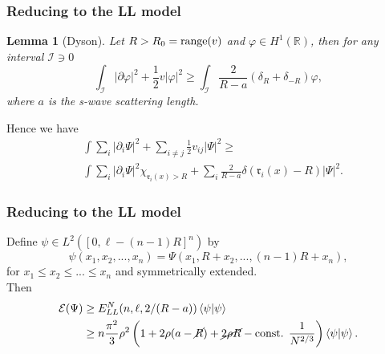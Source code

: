 \documentclass{beamer}[10]
\newcommand{\abs}[1]{\left\lvert #1 \right\rvert}
\renewcommand{\braket}[1]{\left\langle#1\right\rangle}
\newcommand{\R}{\mathbb{R}}
\newtheorem{mlemma}{Lemma}
\begin{document}
\begin{frame}
	\frametitle{Reducing to the LL model}
	\begin{block}{}
		\vspace{-0.5cm}
	\begin{mlemma}[Dyson]\label{LemmaDyson} Let $ R>R_0=\textnormal{range}(v) $ and $ \varphi\in H^1(\R) $, then for any interval $ \mathcal{I}\ni 0 $ 
		\begin{equation}
		\int_{\mathcal{I}} \abs{\partial \varphi}^2+\frac12 v\abs{\varphi}^2\geq \int_{\mathcal{I}}\frac{2}{R-a}\left(\delta_R+\delta_{-R}\right)\varphi,
		\end{equation}
		where $ a $ is the s-wave scattering length.
	\end{mlemma}
	Hence we have \begin{equation}
	\begin{aligned}
	&\int \sum_{i}\abs{\partial_i\Psi}^2+\sum_{i\neq j} \frac{1}{2}v_{ij}\abs{\Psi}^2\geq\\ &\int\sum_{i}\abs{\partial_i\Psi}^2\chi_{\mathfrak{r}_i(x)>R}+\sum_{i}\frac{2}{R-a}\delta(\mathfrak{r}_i(x)-R)\abs{\Psi}^2.
	\end{aligned}
	\end{equation}	
	\end{block}	
\end{frame}


\begin{frame}
	\frametitle{Reducing to the LL model}
	\begin{block}{}
		\vspace{-0.5cm}
		Define $ \psi\in L^2([0,\ell-(n-1)R]^n) $ by 
			$$ \psi(x_1,x_2,...,x_n)=\Psi(x_1,R+x_2,...,(n-1)R+x_n), $$
			 for $ x_1\leq x_2\leq...\leq x_n $ and symmetrically extended.\\
			 Then \begin{equation}
			 \begin{aligned}
			 \mathcal{E}(\Psi)&\geq E^N_{LL}(n,\ell,2/(R-a))\braket{\psi|\psi}\\
			 &\geq n\frac{\pi^2}{3}\rho^2\left(1+2\rho(a-\cancel{R})+\cancel{2\rho R}-\text{const. }\frac{1}{N^{2/3}}\right)\braket{\psi|\psi}.
			 \end{aligned}
			 \end{equation}
	\end{block}	
\end{frame}
\end{document}
